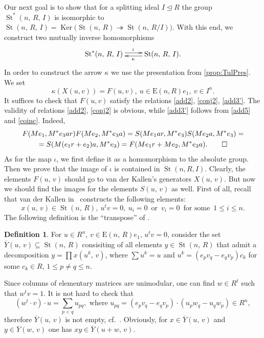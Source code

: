 \documentclass[11pt]{amsart}
\theoremstyle{plain} \declaretheorem[name=Theorem, Refname={Theorem,Theorems}]{tm} \Crefname{tm}{Theorem}{Theorems}
\numberwithin{equation}{section}
\theoremstyle{definition} \newtheorem{df}[lm]{Definition} \Crefname{df}{Definition}{Definitions}
\theoremstyle{remark} \newtheorem{rk}[lm]{Remark} \Crefname{rk}{Remark}{Remarks}
\newcommand{\Ker}{\mathop{\mathrm{Ker}}\nolimits}
\newcommand{\E}{{\mathrm{E}}}
\newcommand{\St}{\mathop{\mathrm{St}}\nolimits}
\newcommand{\epi}{\twoheadrightarrow}
\begin{document}
Our next goal is to show that for a splitting ideal $I\trianglelefteq R$ the group $\St^*(n,\,R,\,I)$ is isomorphic to $\St(n,\,R,\,I)=\Ker\big(\St(n,\,R)\epi\St(n,\,R/I)\big)$.
With this end, we construct two mutually inverse homomorphisms
$$\xymatrix{\St^*(n,\,R,\,I)\ar@<0.5ex>[r]^{\iota}&\St(n,\,R,\,I)\ar@<0.5ex>[l]^{\kappa}.}$$
In order to construct the arrow $\kappa$ we use the presentation from \cref{prop:TulPres}.
We set $$\kappa(X(u,v)) = F(u,v),\ u\in \E(n, R)e_1,\ v\in I^n.$$ 
It suffices to check that $F(u,v)$ satisfy the relations \eqref{add2}, \eqref{conj2}, \eqref{add3'}.
The validity of relations \eqref{add2}, \eqref{conj2} is obvious, while \eqref{add3'} follows from \eqref{add5} and \eqref{coinc}. Indeed,
\begin{multline} F(Me_1, M^*e_3ar) F(Me_2, M^*e_3a) = S(Me_1ar, M^*e_3) S(Me_2a, M^*e_3) = \\ = S(M(e_1r+e_2)a, M^*e_3) = F(Me_1r+Me_2, M^*e_3a). \qedhere \end{multline}
As for the map $\iota$, we first define it as a homomorphism to the absolute group. %
Then we prove that the image of $\iota$ is contained in $\St(n, R, I)$.
Clearly, the elements $F(u,\,v)$ should go to van der Kallen's generators $X(u,\,v)$.
But now we should find the images for the elements $S(u,\,v)$ as well.
First of all, recall that van der Kallen in~\cite[3.8--3.10]{vdK} constructs the following elements:
$$x(u,\,v)\in\St(n,\,R),\ u^tv=0,\ u_i=0\,\text{ or }\,v_i=0\,\text{ for some }\,1\leq i\leq n.$$
The following definition is the ``transpose'' of \cite[3.13]{vdK}.
\begin{df} For $u\in R^n$, $v\in\E(n,\,R)e_1$, $u^tv=0$, consider the set $\overline Y(u,\,v)\subseteq\St(n,\,R)$
 consisiting of all elements $y\in\St(n,\,R)$ that admit a decomposition $y=\prod x(u^k,\,v)$, 
 where $\sum u^k=u$ and $u^k= (e_pv_q-e_qv_p)c_k$ for some $c_k\in R$, $1\leq p\neq q\leq n$. \end{df}

Since columns of elementary matrices are unimodular, one can find $w\in R^t$ such that $w^tv=1$.
It is not hard to check that \setcounter{equation}{6} \setcounter{lm}{7}
\begin{equation} (w^t\cdot v)\cdot u = \sum_{p<q}u_{pq},\text{ where }u_{pq} = (e_pv_q - e_qv_p)\cdot  (u_pw_q - u_qw_p)\in{}\!R^n, \label{eq:canonical}\end{equation}
therefore $\overline Y(u,\,v)$ is not empty, cf.~\cite[3.1--3.2]{vdK}.
Obviously, for $x\in\overline Y(u,\,v)$ and $y\in\overline Y(w,\,v)$ one has $xy\in\overline Y(u+w,\,v)$.
\end{document}
